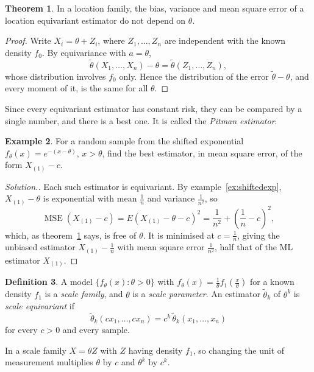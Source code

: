 \documentclass[12pt,a4paper]{report}
\theoremstyle{definition}
\newtheorem{thm}{Theorem}[section]
\newtheorem{defn}[thm]{Definition}
\newtheorem{exa}[thm]{Example}
\DeclareMathOperator{\MSE}{MSE}
\newenvironment{solution}
  {\renewcommand{\qedsymbol}{}\begin{proof}[\textit{Solution}.]}
  {\end{proof}}
\begin{document}
\begin{thm}
\label{thm:equivariantrisk}
In a location family, the bias, variance and mean square error of a location
equivariant estimator do not depend on $\theta$.
\end{thm}

\begin{proof}
Write $X_i = \theta + Z_i$, where $Z_1, \dots, Z_n$ are independent with the known
density $f_0$. By equivariance with $a = \theta$,
\[\tilde\theta(X_1, \dots, X_n) - \theta = \tilde\theta(Z_1, \dots, Z_n),\]
whose distribution involves $f_0$ only. Hence the distribution of the error
$\tilde\theta - \theta$, and every moment of it, is the same for all $\theta$.
\end{proof}

Since every equivariant estimator has constant risk, they can be compared by a
single number, and there is a best one. It is called the \emph{Pitman estimator}.

\begin{exa}
\label{ex:bestequivariant}
For a random sample from the shifted exponential $f_\theta(x) = e^{-(x - \theta)}$,
$x>\theta$, find the best estimator, in mean square error, of the form
$X_{(1)} - c$.
\end{exa}

\begin{solution}
Each such estimator is equivariant. By example~\ref{ex:shiftedexp},
$X_{(1)} - \theta$ is exponential with mean $\frac1n$ and variance $\frac1{n^2}$, so
\[\MSE\left(X_{(1)} - c\right) = E\left(X_{(1)} - \theta - c\right)^2
= \frac{1}{n^2} + \left(\frac1n - c\right)^2 ,\]
which, as theorem~\ref{thm:equivariantrisk} says, is free of $\theta$. It is minimised
at $c = \frac1n$, giving the unbiased estimator $X_{(1)} - \frac1n$ with mean square
error $\frac{1}{n^2}$, half that of the ML estimator $X_{(1)}$.
\end{solution}

\begin{defn}
\label{def:scalefamily}
A model $\{f_\theta(x) : \theta>0\}$ with $f_\theta(x) = \frac1\theta f_1\left(\frac x\theta\right)$
for a known density $f_1$ is a \emph{scale family}, and $\theta$ is a \emph{scale
parameter}. An estimator $\tilde\theta_k$ of $\theta^k$ is \emph{scale equivariant} if
\[\tilde\theta_k(cx_1, \dots, cx_n) = c^k\,\tilde\theta_k(x_1, \dots, x_n)\]
for every $c>0$ and every sample.
\end{defn}

In a scale family $X = \theta Z$ with $Z$ having density $f_1$, so changing the unit
of measurement multiplies $\theta$ by $c$ and $\theta^k$ by $c^k$.
\end{document}
